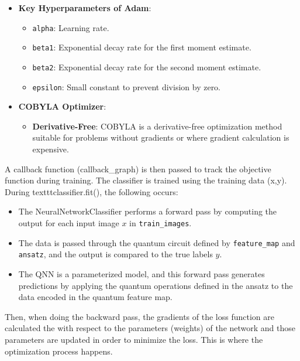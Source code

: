 \documentclass[conference]{IEEEtran}
\begin{document}
\begin{itemize}
\begin{itemize}
        \item \textbf{Key Hyperparameters of Adam}:
        \begin{itemize}
            \item \texttt{alpha}: Learning rate.
            \item \texttt{beta1}: Exponential decay rate for the first moment estimate.
            \item \texttt{beta2}: Exponential decay rate for the second moment estimate.
            \item \texttt{epsilon}: Small constant to prevent division by zero.
        \end{itemize}
        
        \item \textbf{COBYLA Optimizer}:
        \begin{itemize}
            \item \textbf{Derivative-Free}: COBYLA is a derivative-free optimization method suitable for problems without gradients or where gradient calculation is expensive.
        \end{itemize}
    \end{itemize}
    
    A callback function (callback\_graph) is  then passed to track the objective function during training. The classifier is trained using the training data (x,y).\\
    

    During texttt{classifier.fit()}, the following occurs:

    \begin{itemize}
        \item The NeuralNetworkClassifier performs a forward pass by computing the output for each input image \( x \) in \texttt{train\_images}.
        \item The data is passed through the quantum circuit defined by \texttt{feature\_map} and \texttt{ansatz}, and the output is compared to the true labels \( y \).
        \item The QNN is a parameterized model, and this forward pass generates predictions by applying the quantum operations defined in the ansatz to the data encoded in the quantum feature map.
    \end{itemize}
     
    

    Then, when doing the backward pass, the gradients of the loss function are calculated the with respect to the parameters (weights) of the network and those parameters are updated in order to minimize the loss. This is where the optimization process happens.
    

\end{itemize}
\end{document}
